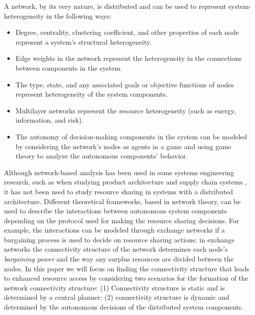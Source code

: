 \documentclass[journal,onecolumn]{IEEEtran}
\theoremstyle{plain}
\begin{document}
A network, by its very nature, is distributed and can be used to represent system-heterogeneity in the following ways:
\begin{itemize}
\item Degree, centrality, clustering coefficient, and other properties of each node represent a system's structural heterogeneity. 
\item Edge weights in the network represent the heterogeneity in the connections between components in the system. 
\item The type, state, and any associated goals or objective functions of nodes represent heterogeneity of the system components. 
\item Multilayer networks \citep{kivela2014multilayer, de2013centrality} represent the resource heterogeneity (such as energy, information, and risk). 
\item The autonomy of decision-making components in the system can be modeled by considering the network's nodes as agents in a game and using game theory to analyze the autonomous components' behavior. 
\end{itemize}

Although network-based analysis has been used in some systems engineering research, such as when studying product architecture \citep{bartolomei2012engineering, braha2006structure, batallas2006information} and supply chain systems \citep{bellamy2013network}, it has not been used to study resource sharing in systems with a distributed architecture. Different theoretical frameworks, based in network theory, can be used to describe the interactions between autonomous system components depending on the protocol used for making the resource sharing decisions. For example, the interactions can be modeled through exchange networks \citep{bayati2015bargaining, kleinberg2008balanced} if a bargaining process is used to decide on resource sharing actions; in exchange networks the connectivity structure of the network determines each node's \textit{bargaining power} and the way any surplus resources are divided between the nodes. In this paper we will focus on finding the connectivity structure that leads to enhanced resource access by considering two scenarios for the formation of the network connectivity structure: (1) Connectivity structure is static and is determined by a central planner; (2) connectivity structure is dynamic and determined by the autonomous decisions of the distributed system components.
\end{document}
